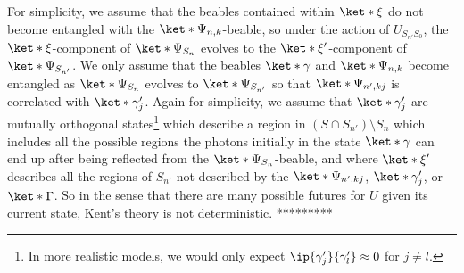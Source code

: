 For simplicity, we assume that the beables contained within $\ket*{\xi}$ do not become entangled with the $\ket*{\Psi_{n,k}}$-beable, so under the action of $U_{S_{n'}S_0}$, the $\ket*{\xi}$-component of $\ket*{\Psi_{S_n}}$ evolves to the $\ket*{\xi'}$-component of $\ket*{\Psi_{S_{n'}}}$. We only assume that the beables $\ket*{\gamma}$ and $\ket*{\Psi_{n,k}}$ become entangled as $\ket*{\Psi_{S_n}}$ evolves to $\ket*{\Psi_{S_{n'}}}$ so that  $\ket*{\Psi_{n', kj}}$ is correlated with  $\ket*{\gamma_{j}'}$. Again for simplicity, we assume that $\ket*{\gamma_{j}'}$ are mutually orthogonal states\footnote{In more realistic models, we would only expect $\ip{\gamma_{j}'}{\gamma_{l}'}\approx 0$ for $j\neq l.$ } which  describe a region in $(S\cap S_{n'})\setminus S_n$ which includes all the possible regions the photons initially in the state $\ket*{\gamma}$ can end up after being reflected from the $\ket*{\Psi_{S_n}}$-beable, and where $\ket*{\xi'}$ describes all the regions of $S_{n'}$ not described by the $\ket*{\Psi_{n',kj}}$, $\ket*{\gamma_j'}$, or $\ket*{\Gamma}$. So in the sense that there are many possible futures for $U$ given its current state, Kent's theory is not deterministic. *********

